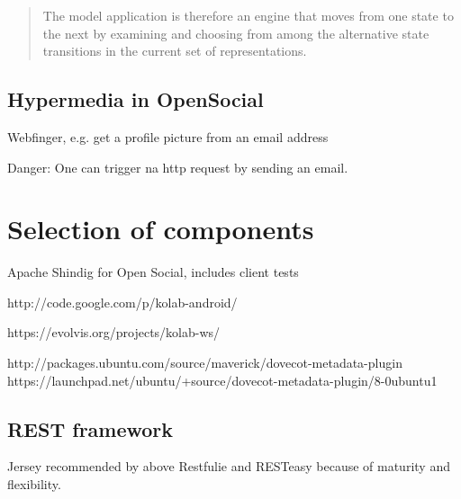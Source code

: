 \documentclass[12pt,a4paper]{scrartcl}		%
\begin{document}



\begin{quotation}
  The model application is therefore an engine that moves from one state to the next by examining and choosing from among the alternative state transitions in the current set of representations.
\end{quotation}\cite[sec. 5.3, p.103]{Fielding2000}

\subsection{Hypermedia in OpenSocial}

Webfinger, e.g. get a profile picture from an email address

Danger: One can trigger na http request by sending an email.

\section{Selection of components}

Apache Shindig for Open Social, includes client tests

http://code.google.com/p/kolab-android/

https://evolvis.org/projects/kolab-ws/

http://packages.ubuntu.com/source/maverick/dovecot-metadata-plugin
https://launchpad.net/ubuntu/+source/dovecot-metadata-plugin/8-0ubuntu1



\subsection{REST framework}
Jersey recommended by \cite{Kaiser2011} above Restfulie and RESTeasy because of maturity and flexibility.
\end{document}
